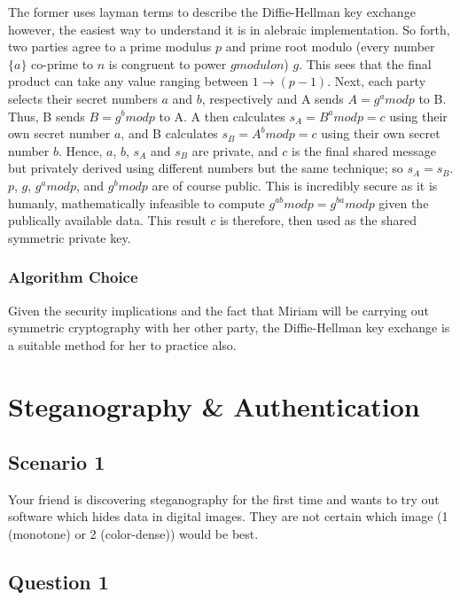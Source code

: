 \documentclass[11pt, english]{article}
\begin{document}
	The former uses layman terms to describe the Diffie-Hellman key exchange however, the easiest way to understand it is in alebraic implementation. So forth, two parties agree to a prime modulus $p$ and prime root modulo (every number $\{a\}$ co-prime to $n$ is congruent to power $gmodulon$) $g$. This sees that the final product can take any value ranging between $1\rightarrow(p-1)$. Next, each party selects their secret numbers $a$ and $b$, respectively and A sends $A=g^{a}modp$ to B. Thus, B sends $B=g^{b}modp$ to A. A then calculates $s_{A}=B^{a}modp=c$ using their own secret number $a$, and B calculates $s_{B}=A^{b}modp=c$ using their own secret number $b$. Hence, $a$, $b$, $s_{A}$ and $s_{B}$ are private, and $c$ is the final shared message but privately derived using different numbers but the same technique; so $s_{A}=s_{B}$. $p$, $g$, $g^{a}modp$, and $g^{b}modp$ are of course public. This is incredibly secure as it is humanly, mathematically infeasible to compute $g^{ab}modp=g^{ba}modp$ given the publically available data. This result $c$ is therefore, then used as the shared symmetric private key.

		\subsubsection{Algorithm Choice}

	Given the security implications and the fact that Miriam will be carrying out symmetric cryptography with her other party, the Diffie-Hellman key exchange is a suitable method for her to practice also.

\newpage

\section{Steganography \& Authentication}

	\subsection{Scenario 1}

	Your friend is discovering steganography for the first time and wants to try out software which hides data in digital images. They are not certain which image (1 (monotone) or 2 (color-dense)) would be best.

	\subsection{Question 1}
\end{document}

